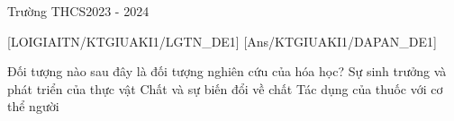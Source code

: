 \def\x{210}
\setcounter{bt}{0}
\setcounter{ex}{0}
\begin{name}[][Hóa][10][]{Trường THCS}{2023 - 2024}
\end{name}

[LOIGIAITN/KTGIUAKI1/LGTN_DE1]
[Ans/KTGIUAKI1/DAPAN_DE1]
\begin{ex}
	Đối tượng nào sau đây là đối tượng nghiên cứu của hóa học?
	{Sự sinh trưởng và phát triển của thực vật}
	{Chất và sự biến đổi về chất}
	{Tác dụng của thuốc với cơ thể người}
	\loigiai{}
\end{ex}
